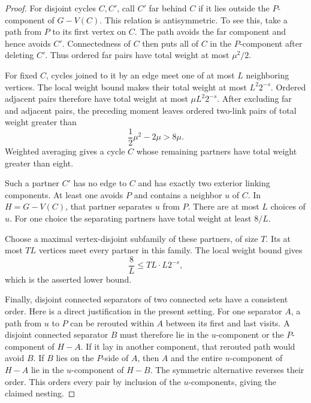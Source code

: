 \begin{proof}
For disjoint cycles $C,C'$, call $C'$ far behind $C$ if it lies outside the $P$-component of $G-V(C)$.
This relation is antisymmetric.
To see this, take a path from $P$ to its first vertex on $C$.
The path avoids the far component and hence avoids $C'$.
Connectedness of $C$ then puts all of $C$ in the $P$-component after deleting $C'$.
Thus ordered far pairs have total weight at most $\mu^2/2$.

For fixed $C$, cycles joined to it by an edge meet one of at most $L$ neighboring vertices.
The local weight bound makes their total weight at most $L^2 2^{-s}$.
Ordered adjacent pairs therefore have total weight at most $\mu L^2 2^{-s}$.
After excluding far and adjacent pairs, the preceding moment leaves ordered two-link pairs of total weight greater than
\[
 \frac12\mu^2-2\mu>8\mu.
\]
Weighted averaging gives a cycle $C$ whose remaining partners have total weight greater than eight.

Such a partner $C'$ has no edge to $C$ and has exactly two exterior linking components.
At least one avoids $P$ and contains a neighbor $u$ of $C$.
In $H=G-V(C)$, that partner separates $u$ from $P$.
There are at most $L$ choices of $u$.
For one choice the separating partners have total weight at least $8/L$.

Choose a maximal vertex-disjoint subfamily of these partners, of size $T$.
Its at most $TL$ vertices meet every partner in this family.
The local weight bound gives
\[
 \frac8L\le TL\cdot L2^{-s},
\]
which is the asserted lower bound.

Finally, disjoint connected separators of two connected sets have a consistent order.
Here is a direct justification in the present setting.
For one separator $A$, a path from $u$ to $P$ can be rerouted within $A$ between its first and last visits.
A disjoint connected separator $B$ must therefore lie in the $u$-component or the $P$-component of $H-A$.
If it lay in another component, that rerouted path would avoid $B$.
If $B$ lies on the $P$-side of $A$, then $A$ and the entire $u$-component of $H-A$ lie in the $u$-component of $H-B$.
The symmetric alternative reverses their order.
This orders every pair by inclusion of the $u$-components, giving the claimed nesting.
\end{proof}
